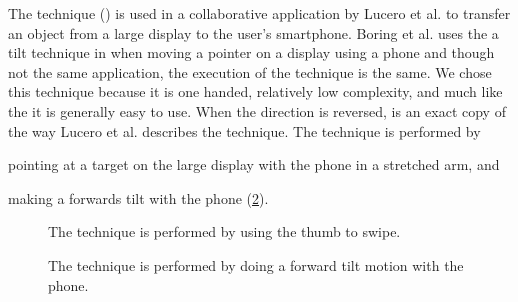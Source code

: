 The \tilt technique () is used in a collaborative application by Lucero et al. \cite{Lucero:2012} to transfer an object from a large display to the user's smartphone.
Boring et al. uses the a tilt technique in \cite{Boring:2009} when moving a pointer on a display using a phone and though not the same application, the execution of the technique is the same.
We chose this technique because it is one handed, relatively low complexity, and much like the \swipe it is generally easy to use.
When the direction is reversed, \tilt is an exact copy of the way Lucero et al. describes the technique.
The \tilt technique is performed by 
\begin{enumerate*}[label=\itshape\roman*\upshape)]
	\item{pointing at a target on the large display with the phone in a stretched arm, and}
	\item{making a forwards tilt with the phone (\cref{fig:tiltTechnique}).}
\end{enumerate*}

\begin{figure}[H]
\caption{
	\protect{} The \swipe technique is performed by using the thumb to swipe.
}
\label{fig:swipeTechnique}
\end{figure}

\begin{figure}[H]
\caption{
	\protect{} The \tilt technique is performed by doing a forward tilt motion with the phone.
}
\label{fig:tiltTechnique}
\end{figure}

